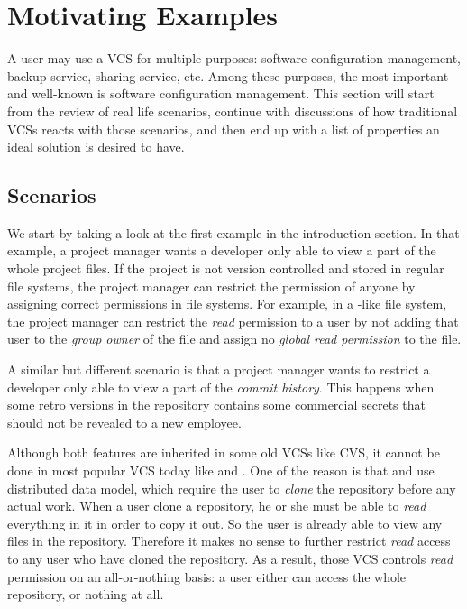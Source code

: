 \section{Motivating Examples}
\label{s:motivation}

A user may use a VCS for multiple purposes: software configuration management,
backup service, sharing service, etc.
Among these purposes, the most important and well-known is software
configuration management. This section will start from the review of
 real life scenarios, continue with discussions of how traditional
VCSs reacts with those scenarios, and then end up with a list of properties an
ideal solution is desired to have.

\subsection{Scenarios}


We start by taking a look at the first example in the introduction section.
In that example, a project manager wants a developer only able to view a part of
the whole project files. If the project is not version controlled and stored in
regular file systems, the project manager can restrict the permission of anyone
by assigning correct permissions in file systems. For example, in a \unix-like
file system, the project manager can restrict the \emph{read} permission to a user
by not adding that user to the \emph{group owner} of the file and assign no
\emph{global read permission} to the file.

A similar but different scenario is that a project manager wants to restrict a
developer only able to view a part of the \emph{commit history}. This happens
when some retro versions in the repository contains some commercial secrets that
should not be revealed to a new employee.

Although both features are inherited in some old VCSs like CVS\cite{cvs}, it cannot
be done in most popular VCS today like \git\cite{git} and
\mercurial\cite{mercurial}. One of the reason is that \git and \mercurial use distributed data
model, which require the user to \emph{clone} the repository before any actual
work. When a user clone a repository, he or she must be able to \emph{read}
everything in it in order to copy it out. So the user is already able to view
any files in the repository. Therefore it makes no sense to further restrict
\emph{read} access to any user who have cloned the repository. As a result,
those VCS controls \emph{read} permission on an all-or-nothing basis: a user
either can access the whole repository, or nothing at all.

